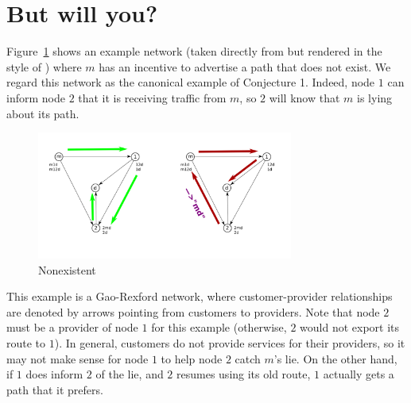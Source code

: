 \documentclass[12pt]{article}
\begin{document}


\section{But will you?}
  Figure~\ref{fig:Nonexistent} shows an example network
  (taken directly from \cite{RoutingGames}
  but rendered in the style of \cite{Attraction})
  where $m$ has an incentive to advertise a path that does not exist.
  We regard this network as the canonical example of Conjecture 1.
  Indeed, node $1$ can inform node $2$ that it is receiving traffic
  from $m$, so $2$ will know that $m$ is lying about its path.
  \begin{figure}[h]
    \centering
    \caption{Nonexistent}\label{fig:Nonexistent}
    \includegraphics[width=0.75\textwidth]{NonexistentBetter}
  \end{figure}

  This example is a Gao-Rexford network, where customer-provider
  relationships are denoted by arrows pointing from customers to providers.
  Note that node $2$ must be a provider of node $1$ for this example
  (otherwise, $2$ would not export its route to $1$).
  In general, customers do not provide services for their providers,
  so it may not make sense for node $1$ to help node $2$ catch $m$'s lie.
  On the other hand, if $1$ does inform $2$ of the lie, and $2$ resumes
  using its old route, $1$ actually gets a path that it prefers.
\end{document}

